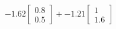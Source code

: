 \documentclass[preview]{standalone}
\begin{document}
\begin{align*}
-1.62 \begin{bmatrix} 0.8 \\ 0.5 \end{bmatrix} + -1.21 \begin{bmatrix} 1 \\ 1.6 \end{bmatrix}
\end{align*}
\end{document}

